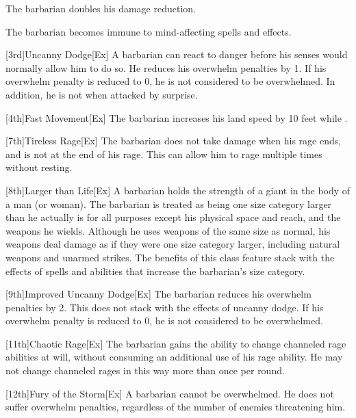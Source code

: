 
The barbarian doubles his damage reduction.

The barbarian becomes immune to mind-affecting spells and effects.

[3rd]{Uncanny Dodge}[Ex]
A barbarian can react to danger before his senses would normally allow him to do so.
He reduces his overwhelm penalties by 1.
If his overwhelm penalty is reduced to 0, he is not considered to be overwhelmed.
In addition, he is not \unaware when attacked by surprise.

[4th]{Fast Movement}[Ex]
The barbarian increases his land speed by 10 feet while \unencumbered.

[7th]{Tireless Rage}[Ex]
The barbarian does not take damage when his rage ends, and is not \fatigued at the end of his rage.
This can allow him to rage multiple times without resting.

[8th]{Larger than Life}[Ex]
A barbarian holds the strength of a giant in the body of a man (or woman).
The barbarian is treated as being one size category larger than he actually is for all purposes except his physical space and reach, and the weapons he wields.
Although he uses weapons of the same size as normal, his weapons deal damage as if they were one size category larger, including natural weapons and unarmed strikes.
The benefits of this class feature stack with the effects of spells and abilities that increase the barbarian's size category.

[9th]{Improved Uncanny Dodge}[Ex]
The barbarian reduces his overwhelm penalties by 2.
This does not stack with the effects of uncanny dodge.
If his overwhelm penalty is reduced to 0, he is not considered to be overwhelmed.

[11th]{Chaotic Rage}[Ex]
The barbarian gains the ability to change channeled rage abilities at will, without consuming an additional use of his rage ability.
He may not change channeled rages in this way more than once per round.

[12th]{Fury of the Storm}[Ex]
A barbarian cannot be overwhelmed.
He does not suffer overwhelm penalties, regardless of the number of enemies threatening him.

